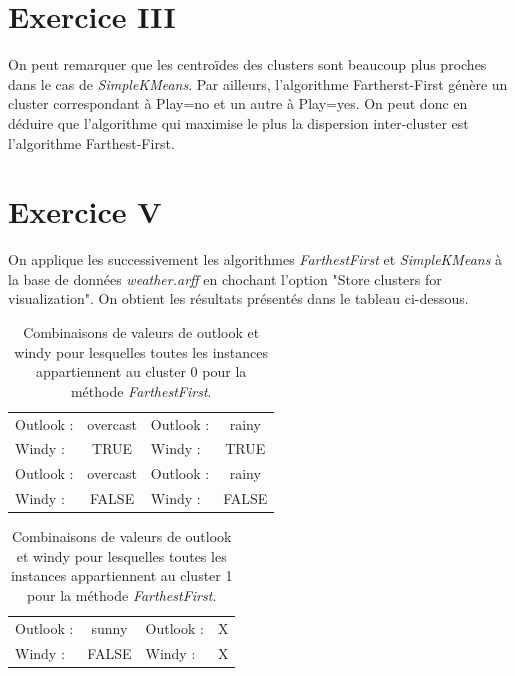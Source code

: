 \documentclass[a4paper, 11pt]{report}
\begin{document}
        \section{Exercice III}
        On peut remarquer que les centroïdes des clusters sont beaucoup plus proches dans le cas de \emph{SimpleKMeans}. Par ailleurs, l'algorithme Fartherst-First génère un cluster correspondant à Play=no et un autre à Play=yes. On peut donc en déduire que l'algorithme qui maximise le plus la dispersion inter-cluster est l'algorithme Farthest-First.
        
	\section{Exercice V}
	On applique les successivement les algorithmes \emph{FarthestFirst } et \emph{SimpleKMeans} à la base de données \emph{weather.arff} en chochant l'option "Store clusters for visualization". On obtient les résultats présentés dans le tableau ci-dessous.

	\begin{table}[h!]
		\centering
		\begin{tabular}{|l|c|l|c|}
			\hline
			Outlook : & overcast  & Outlook : & rainy \\
			Windy : & TRUE & Windy : & TRUE \\
			\hline
			Outlook : & overcast & Outlook : & rainy \\
			Windy : & FALSE & Windy : & FALSE \\
			\hline
		\end{tabular}
		\caption{Combinaisons de valeurs de outlook et windy pour lesquelles toutes les instances appartiennent au cluster 0 pour la méthode \emph{FarthestFirst}.}
		\label{tab:exo5-1}
	\end{table}


	\begin{table}[h!]
		\centering
		\begin{tabular}{|l|c|l|c|}
			\hline
			Outlook : & sunny & Outlook : & X \\
			Windy : & FALSE & Windy : & X \\
			\hline
		\end{tabular}
		\caption{Combinaisons de valeurs de outlook et windy pour lesquelles toutes les instances appartiennent au cluster 1 pour la méthode \emph{FarthestFirst}.}
		\label{tab:exo5-1}
	\end{table}
\end{document}

